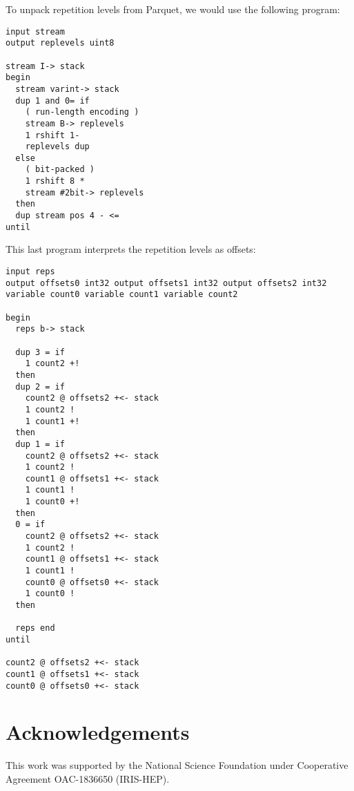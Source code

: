 \documentclass{webofc}
\begin{document}
\noindent To unpack repetition levels from Parquet, we would use the following program:

\begin{Verbatim}[commandchars=\\\{\}]
input stream
output replevels uint8

stream I-> stack
begin
  stream varint-> stack
  dup 1 and 0= if
    ( run-length encoding )
    stream B-> replevels
    1 rshift 1-
    replevels dup
  else
    ( bit-packed )
    1 rshift 8 *
    stream #2bit-> replevels
  then
  dup stream pos 4 - <=
until
\end{Verbatim}

\noindent This last program interprets the repetition levels as offsets:

\begin{Verbatim}[commandchars=\\\{\}]
input reps
output offsets0 int32 output offsets1 int32 output offsets2 int32
variable count0 variable count1 variable count2

begin
  reps b-> stack

  dup 3 = if
    1 count2 +!
  then
  dup 2 = if
    count2 @ offsets2 +<- stack
    1 count2 !
    1 count1 +!
  then
  dup 1 = if
    count2 @ offsets2 +<- stack
    1 count2 !
    count1 @ offsets1 +<- stack
    1 count1 !
    1 count0 +!
  then
  0 = if
    count2 @ offsets2 +<- stack
    1 count2 !
    count1 @ offsets1 +<- stack
    1 count1 !
    count0 @ offsets0 +<- stack
    1 count0 !
  then

  reps end
until

count2 @ offsets2 +<- stack
count1 @ offsets1 +<- stack
count0 @ offsets0 +<- stack
\end{Verbatim}

\section{Acknowledgements}

This work was supported by the National Science Foundation under Cooperative Agreement OAC-1836650 (IRIS-HEP).






\end{document}
